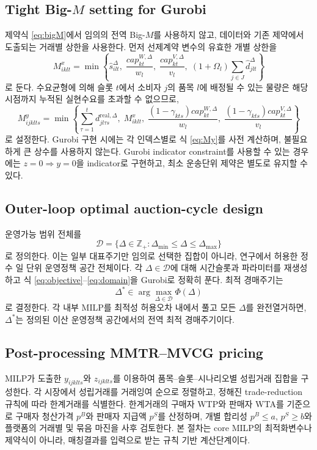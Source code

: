 \documentclass[11pt,a4paper]{article}
\newcommand{\Dset}{\mathcal{D}}
\newcommand{\Zp}{\mathbb{Z}_{+}}
\begin{document}
\subsection{Tight Big-$M$ setting for Gurobi}
제약식 \eqref{eq:bigM}에서 임의의 전역 Big-$M$를 사용하지 않고, 데이터와 기존 제약에서 도출되는 거래별 상한을 사용한다. 먼저 선제계약 변수의 유효한 개별 상한을
\begin{equation}
M^x_{iklt}=\min\left\{
\hat s^{\Delta}_{ilt},\;
\frac{cap^{W,\Delta}_{kt}}{w_l},\;
\frac{cap^{V,\Delta}_{kt}}{v_l},\;
(1+\Omega_l)\sum_{j\in J}\hat d^{\Delta}_{jlt}
\right\}
\label{eq:Mx}
\end{equation}
로 둔다. 수요균형에 의해 슬롯 $t$에서 소비자 $j$의 품목 $l$에 배정될 수 있는 물량은 해당 시점까지 누적된 실현수요를 초과할 수 없으므로,
\begin{equation}
M^y_{ijklts}=\min\left\{
\sum_{\tau=1}^{t}d^{\mathrm{real},\Delta}_{jl\tau s},\;
M^x_{iklt},\;
\frac{(1-\gamma_{kts})cap^{W,\Delta}_{kt}}{w_l},\;
\frac{(1-\gamma_{kts})cap^{V,\Delta}_{kt}}{v_l}
\right\}
\label{eq:My}
\end{equation}
로 설정한다. Gurobi 구현 시에는 각 인덱스별로 식 \eqref{eq:My}를 사전 계산하며, 불필요하게 큰 상수를 사용하지 않는다. Gurobi indicator constraint를 사용할 수 있는 경우에는 $z=0\Rightarrow y=0$을 indicator로 구현하고, 최소 운송단위 제약은 별도로 유지할 수 있다.

\subsection{Outer-loop optimal auction-cycle design}
운영가능 범위 전체를
\begin{equation}
\Dset=\{\Delta\in\Zp:\Delta_{\min}\le\Delta\le\Delta_{\max}\}
\end{equation}
로 정의한다. 이는 일부 대표주기만 임의로 선택한 집합이 아니라, 연구에서 허용한 정수 일 단위 운영정책 공간 전체이다. 각 $\Delta\in\Dset$에 대해 시간슬롯과 파라미터를 재생성하고 식 \eqref{eq:objective}--\eqref{eq:domain}을 Gurobi로 정확히 푼다. 최적 경매주기는
\begin{equation}
\Delta^*\in\arg\max_{\Delta\in\Dset}\Phi(\Delta)
\label{eq:outer}
\end{equation}
로 결정한다. 각 내부 MILP를 최적성 허용오차 내에서 풀고 모든 $\Delta$를 완전열거하면, $\Delta^*$는 정의된 이산 운영정책 공간에서의 전역 최적 경매주기이다.

\subsection{Post-processing MMTR--MVCG pricing}
MILP가 도출한 $y_{ijklts}$와 $z_{ijklts}$를 이용하여 품목--슬롯--시나리오별 성립거래 집합을 구성한다. 각 시장에서 성립거래를 거래잉여 순으로 정렬하고, 정해진 trade-reduction 규칙에 따라 한계거래를 식별한다. 한계거래의 구매자 WTP와 판매자 WTA를 기준으로 구매자 청산가격 $p^B$와 판매자 지급액 $p^S$를 산정하며, 개별 합리성 $p^B\le a$, $p^S\ge b$와 플랫폼의 거래별 및 묶음 마진을 사후 검토한다. 본 절차는 core MILP의 최적화변수나 제약식이 아니라, 매칭결과를 입력으로 받는 규칙 기반 계산단계이다.
\end{document}
